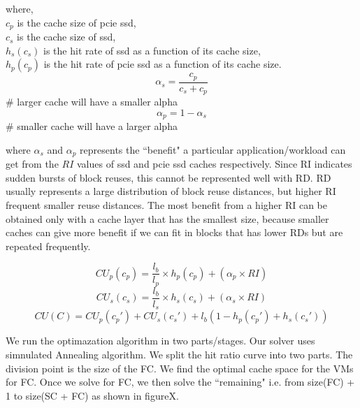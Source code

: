 where, \\ 
$c_p$ is the cache size of pcie ssd, \\
$c_s$ is the cache size of ssd, \\
$h_s(c_s)$ is the hit rate of ssd as a function of its cache size, \\
$h_p(c_p)$ is the hit rate of pcie ssd as a function of its cache size.  \\


$$   \alpha_s = \frac{c_p}{c_s + c_p} $$ \# larger cache will have a smaller alpha
$$   \alpha_p = 1-\alpha_s $$ \# smaller cache will have a larger alpha

where $\alpha_s$ and $\alpha_p$ represents the ``benefit" a particular application/workload can get from the $RI$ values of ssd and pcie ssd caches respectively. Since RI indicates sudden bursts of block reuses, this cannot be represented well with RD. RD usually represents a large distribution of block reuse distances, but higher RI frequent smaller reuse distances. The most benefit from a higher RI can be obtained only with a cache layer that has the smallest size, because smaller caches can give more benefit if we can fit in blocks that has lower RDs but are repeated frequently.



$$ CU_p(c_p) = \frac{l_b}{l_p} \times h_p(c_p) + (\alpha_p \times RI) $$
$$ CU_s(c_s) = \frac{l_b}{l_s} \times h_s(c_s) + (\alpha_s \times RI) $$
$$ CU(C) = CU_p(c_p') + CU_s(c_s') + l_b (1 - h_p(c_p') + h_s(c_s')) $$ 

We run the optimazation algorithm in two parts/stages. Our solver uses simnulated Annealing algorithm. We split the hit ratio curve into two parts. The division point is the size of the FC. We find the optimal cache space for the VMs for FC. Once we solve for FC, we then solve the ``remaining" i.e. from size(FC) + 1 to size(SC + FC) as shown in figureX.
